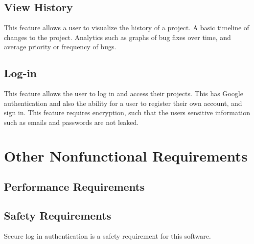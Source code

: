 \documentclass{article}
\newcommand{\comment}[1]{}
\begin{document}
\subsection{View History}
This feature allows a user to visualize the history of a project. A basic timeline of changes to the project. Analytics such as graphs of bug fixes over time, and average priority or frequency of bugs.
\subsection{Log-in}
This feature allows the user to log in and access their projects. This has Google authentication and also the ability for a user to register their own account, and sign in. This feature requires encryption, such that the users sensitive information such as emails and passwords are not leaked.

\newpage 

\section{Other Nonfunctional Requirements}
\subsection{Performance Requirements}
\comment{
If there are performance requirements for the product under various circumstances, stat them here and explain their rationale, to help developers understand the intent and make suitable design choices. Specift the timing relationships for real time systems. Make such requirements as specific as possible. You may need to state performance requirements for individual functional requirements or features.
}
\subsection{Safety Requirements}
\comment{
Specify those requirements that are concerned with possible loss, damage, or harm that could result from use of the product. Define any safeguards or actions that must be taken, as well as actions that must be prevented. Refer to any external policies or regulations that state safety issues that affect the product's design or use. Define any safety certifications that must be satisfied.
	}
Secure log in authentication is a safety requirement for this software.
\\ \\ 
\end{document}
